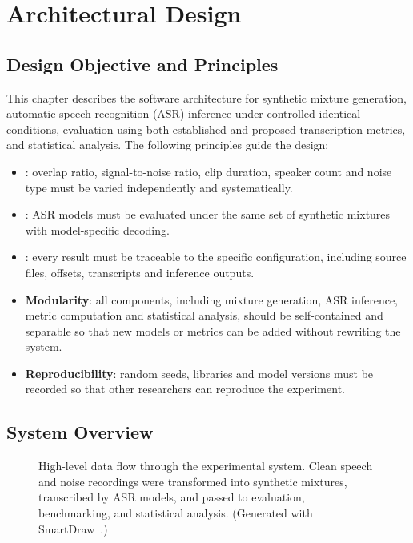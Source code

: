 \chapter{Architectural Design}
\label{chap:arch_design}
\section{Design Objective and Principles}
This chapter describes the software architecture for synthetic mixture generation, automatic speech recognition (ASR) inference under controlled identical conditions, evaluation using both established and proposed transcription metrics, and statistical analysis. The following principles guide the design:
\begin{itemize}
    \item {}: overlap ratio, signal-to-noise ratio, clip duration, speaker count and noise type must be varied independently and systematically.
    \item {}: ASR models must be evaluated under the same set of synthetic mixtures with model-specific decoding.
    \item {}: every result must be traceable to the specific configuration, including source files, offsets, transcripts and inference outputs.
    \item \textbf{Modularity}: all components, including mixture generation, ASR inference, metric computation and statistical analysis, should be self-contained and separable so that new models or metrics can be added without rewriting the system.
    \item \textbf{Reproducibility}: random seeds, libraries and model versions must be recorded so that other researchers can reproduce the experiment.
\end{itemize}



\section{System Overview}
\begin{figure}[ht]
\centering
{}
\caption[High-level data flow through the experimental system.]{High-level data flow through the experimental system. Clean speech and noise recordings were transformed into synthetic mixtures, transcribed by ASR models, and passed to evaluation, benchmarking, and statistical analysis. (Generated with SmartDraw~\cite{smartdraw2026_app}.)}
\label{fig:general_flow}
\end{figure}

